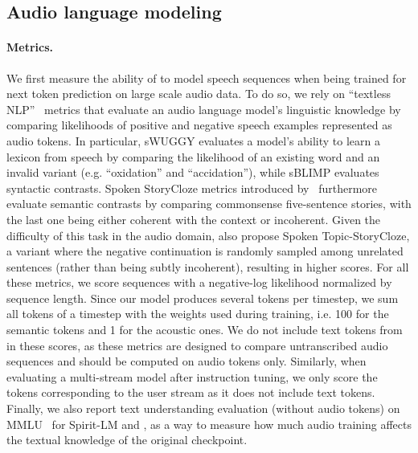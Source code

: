 \subsection{Audio language modeling}
\label{sec:eval_audiolm}
\paragraph{Metrics.} We first measure the ability of \ours{} to model speech sequences when being trained for next token prediction on large scale audio data. To do so, we rely on ``textless NLP''~\citep{gslm} metrics that evaluate an audio language model's linguistic knowledge by comparing likelihoods of positive and negative speech examples represented as audio tokens. In particular, sWUGGY evaluates a model's ability to learn a lexicon from speech by comparing the likelihood of an existing word and an invalid variant (e.g. ``oxidation'' and ``accidation''), while sBLIMP evaluates syntactic contrasts. Spoken StoryCloze metrics introduced by~\citet{twist} furthermore evaluate semantic contrasts by comparing commonsense five-sentence stories, with the last one being either coherent with the context or incoherent. Given the difficulty of this task in the audio domain, \citet{twist} also propose  Spoken Topic-StoryCloze, a variant  where the negative continuation is randomly sampled among unrelated sentences (rather than being subtly incoherent), resulting in higher scores. For all these metrics, we score sequences with a negative-log likelihood normalized by sequence length. Since our model produces several tokens per timestep, we sum all tokens of a timestep with the weights used during training, i.e. 100 for the semantic tokens and 1 for the acoustic ones. We do not include text tokens from \interleaving{} in these scores, as these metrics are designed to compare untranscribed audio sequences and should be computed on audio tokens only. Similarly, when evaluating a multi-stream model after instruction tuning, we only score the tokens corresponding to the user stream as it does not include text tokens. Finally, we also report text understanding  evaluation (without audio tokens) on MMLU~\citep{hendrycks2020measuring} for Spirit-LM and \ours{}, as a way to measure how much audio training affects the textual knowledge of the original checkpoint.
